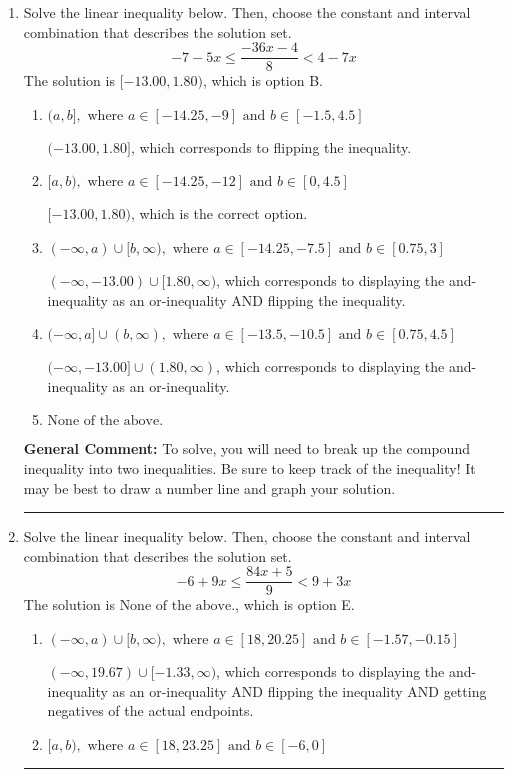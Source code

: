 \documentclass{extbook}[14pt]
\newcommand{\litem}[1]{\item #1

\rule{\textwidth}{0.4pt}}
\begin{document}
\begin{enumerate}
{\textbf{General Comment:} When thinking about this language, it helps to draw a number line and try points.
}
\litem{
Solve the linear inequality below. Then, choose the constant and interval combination that describes the solution set.
\[ -7 - 5 x \leq \frac{-36 x - 4}{8} < 4 - 7 x \]The solution is \( [-13.00, 1.80) \), which is option B.\begin{enumerate}[label=\Alph*.]
\item \( (a, b], \text{ where } a \in [-14.25, -9] \text{ and } b \in [-1.5, 4.5] \)

$(-13.00, 1.80]$, which corresponds to flipping the inequality.
\item \( [a, b), \text{ where } a \in [-14.25, -12] \text{ and } b \in [0, 4.5] \)

$[-13.00, 1.80)$, which is the correct option.
\item \( (-\infty, a) \cup [b, \infty), \text{ where } a \in [-14.25, -7.5] \text{ and } b \in [0.75, 3] \)

$(-\infty, -13.00) \cup [1.80, \infty)$, which corresponds to displaying the and-inequality as an or-inequality AND flipping the inequality.
\item \( (-\infty, a] \cup (b, \infty), \text{ where } a \in [-13.5, -10.5] \text{ and } b \in [0.75, 4.5] \)

$(-\infty, -13.00] \cup (1.80, \infty)$, which corresponds to displaying the and-inequality as an or-inequality.
\item \( \text{None of the above.} \)


\end{enumerate}

\textbf{General Comment:} To solve, you will need to break up the compound inequality into two inequalities. Be sure to keep track of the inequality! It may be best to draw a number line and graph your solution.
}
\litem{
Solve the linear inequality below. Then, choose the constant and interval combination that describes the solution set.
\[ -6 + 9 x \leq \frac{84 x + 5}{9} < 9 + 3 x \]The solution is \( \text{None of the above.} \), which is option E.\begin{enumerate}[label=\Alph*.]
\item \( (-\infty, a) \cup [b, \infty), \text{ where } a \in [18, 20.25] \text{ and } b \in [-1.57, -0.15] \)

$(-\infty, 19.67) \cup [-1.33, \infty)$, which corresponds to displaying the and-inequality as an or-inequality AND flipping the inequality AND getting negatives of the actual endpoints.
\item \( [a, b), \text{ where } a \in [18, 23.25] \text{ and } b \in [-6, 0] \)


\end{enumerate}}
\end{enumerate}
\end{document}
